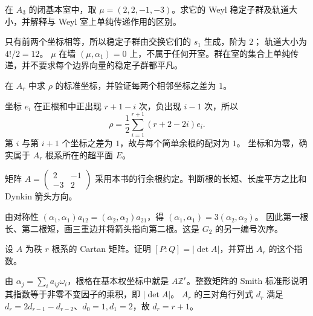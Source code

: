\begin{exercise}\label{b5:ex:17-boundary-stabilizer}
	在 \(A_3\) 的闭基本室中，取 \(\mu=(2,2,-1,-3)\)。求它的 Weyl 稳定子群及轨道大小，并解释与 Weyl 室上单纯传递作用的区别。
\end{exercise}
\begin{solution}
	只有前两个坐标相等，所以稳定子群由交换它们的 \(s_1\) 生成，阶为 \(2\)； 轨道大小为 \(4!/2=12\)。 \(\mu\) 在墙 \((\mu,\alpha_1)=0\) 上，不属于任何开室。群在室的集合上单纯传递，并不要求每个边界向量的稳定子群都平凡。
\end{solution}

\begin{exercise}\label{b5:ex:17-rho-a}
	在 \(A_{r}\) 中求 \(\rho\) 的标准坐标，并验证每两个相邻坐标之差为 \(1\)。
\end{exercise}
\begin{solution}
	坐标 \(e_i\) 在正根和中正出现 \(r+1-i\) 次，负出现 \(i-1\) 次，所以
	\[
		\rho=\frac12\sum_{i=1}^{r+1}(r+2-2i)e_i.
	\]
	第 \(i\) 与第 \(i+1\) 个坐标之差为 \(1\)，故与每个简单余根的配对为 \(1\)。 坐标和为零，确实属于 \(A_r\) 根系所在的超平面 \(E\)。
\end{solution}

\begin{exercise}\label{b5:ex:17-cartan-arrows}
	矩阵
	\(A=\left(\begin{smallmatrix}2&-1\\-3&2\end{smallmatrix}\right)\)
	采用本书的行余根约定。判断根的长短、长度平方之比和 Dynkin 箭头方向。
\end{exercise}
\begin{solution}
	由对称性 \((\alpha_1,\alpha_1)a_{12}=(\alpha_2,\alpha_2)a_{21}\)，得 \((\alpha_1,\alpha_1)=3(\alpha_2,\alpha_2)\)。 因此第一根长、第二根短，画三重边并将箭头指向第二根。这是 \(G_2\) 的另一编号次序。
\end{solution}

\begin{exercise}\label{b5:ex:17-cartan-index}
	设 \(A\) 为秩 \(r\) 根系的 Cartan 矩阵。证明 \([P:Q]=|\det A|\)，并算出 \(A_r\) 的这个指数。
\end{exercise}
\begin{solution}
	由 \(\alpha_j=\sum_i a_{ij}\omega_i\)，根格在基本权坐标中就是 \(A\mathbb Z^r\)。整数矩阵的 Smith 标准形说明其指数等于非零不变因子的乘积，即 \(|\det A|\)。 \(A_r\) 的三对角行列式 \(d_r\) 满足 \(d_r=2d_{r-1}-d_{r-2}\)、\(d_0=1,d_1=2\)，故 \(d_r=r+1\)。
\end{solution}

